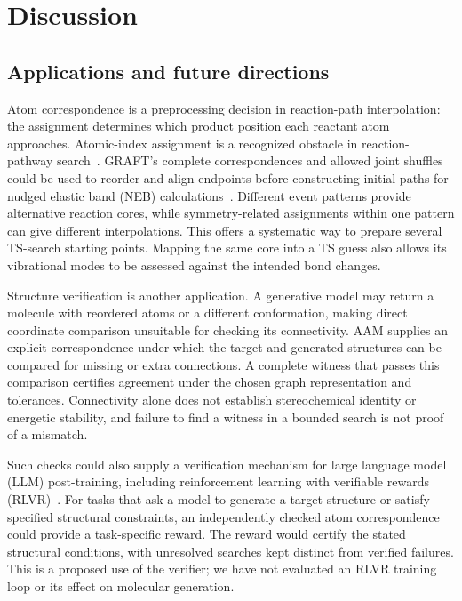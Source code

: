 \FloatBarrier
\section{Discussion}

\subsection{Applications and future directions}

Atom correspondence is a preprocessing decision in reaction-path interpolation: the assignment determines which product position each reactant atom approaches. Atomic-index assignment is a recognized obstacle in reaction-pathway search~\citep{de2019}. GRAFT's complete correspondences and allowed joint shuffles could be used to reorder and align endpoints before constructing initial paths for nudged elastic band (NEB) calculations~\citep{henkelman2000}. Different event patterns provide alternative reaction cores, while symmetry-related assignments within one pattern can give different interpolations. This offers a systematic way to prepare several TS-search starting points. Mapping the same core into a TS guess also allows its vibrational modes to be assessed against the intended bond changes.

Structure verification is another application. A generative model may return a molecule with reordered atoms or a different conformation, making direct coordinate comparison unsuitable for checking its connectivity. AAM supplies an explicit correspondence under which the target and generated structures can be compared for missing or extra connections. A complete witness that passes this comparison certifies agreement under the chosen graph representation and tolerances. Connectivity alone does not establish stereochemical identity or energetic stability, and failure to find a witness in a bounded search is not proof of a mismatch.

Such checks could also supply a verification mechanism for large language model (LLM) post-training, including reinforcement learning with verifiable rewards (RLVR)~\citep{lambert2024}. For tasks that ask a model to generate a target structure or satisfy specified structural constraints, an independently checked atom correspondence could provide a task-specific reward. The reward would certify the stated structural conditions, with unresolved searches kept distinct from verified failures. This is a proposed use of the verifier; we have not evaluated an RLVR training loop or its effect on molecular generation.


